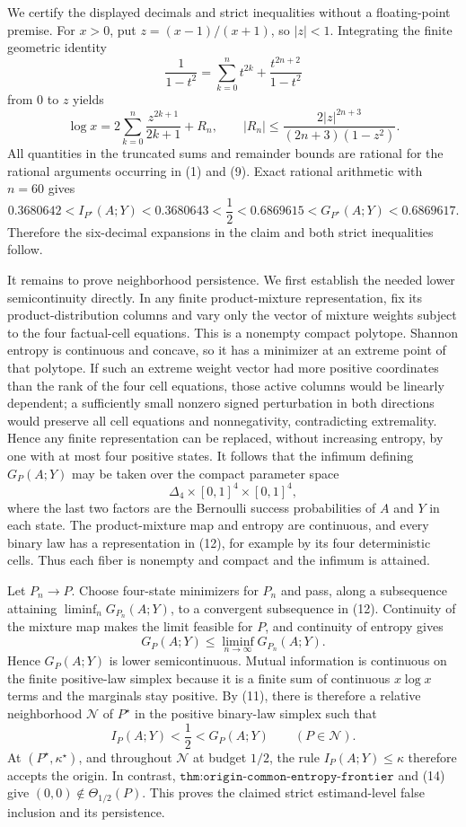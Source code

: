 We certify the displayed decimals and strict inequalities without a floating-point premise. For \(x>0\), put \(z=(x-1)/(x+1)\), so \(|z|<1\). Integrating the finite geometric identity
\[
\frac1{1-t^2}=\sum_{k=0}^{n}t^{2k}+\frac{t^{2n+2}}{1-t^2}
\]
from \(0\) to \(z\) yields
\[
\log x=2\sum_{k=0}^{n}\frac{z^{2k+1}}{2k+1}+R_n,
\qquad
|R_n|\leq
\frac{2|z|^{2n+3}}{(2n+3)(1-z^2)}.
\tag{10}
\]
All quantities in the truncated sums and remainder bounds are rational for the rational arguments occurring in (1) and (9). Exact rational arithmetic with \(n=60\) gives
\[
0.3680642<I_{P^\star}(A;Y)<0.3680643<\frac12
<0.6869615<G_{P^\star}(A;Y)<0.6869617.
\tag{11}
\]
Therefore the six-decimal expansions in the claim and both strict inequalities follow.

It remains to prove neighborhood persistence. We first establish the needed lower semicontinuity directly. In any finite product-mixture representation, fix its product-distribution columns and vary only the vector of mixture weights subject to the four factual-cell equations. This is a nonempty compact polytope. Shannon entropy is continuous and concave, so it has a minimizer at an extreme point of that polytope. If such an extreme weight vector had more positive coordinates than the rank of the four cell equations, those active columns would be linearly dependent; a sufficiently small nonzero signed perturbation in both directions would preserve all cell equations and nonnegativity, contradicting extremality. Hence any finite representation can be replaced, without increasing entropy, by one with at most four positive states. It follows that the infimum defining \(G_P(A;Y)\) may be taken over the compact parameter space
\[
\Delta_4\times[0,1]^4\times[0,1]^4,
\tag{12}
\]
where the last two factors are the Bernoulli success probabilities of \(A\) and \(Y\) in each state. The product-mixture map and entropy are continuous, and every binary law has a representation in (12), for example by its four deterministic cells. Thus each fiber is nonempty and compact and the infimum is attained.

Let \(P_n\to P\). Choose four-state minimizers for \(P_n\) and pass, along a subsequence attaining \(\liminf_nG_{P_n}(A;Y)\), to a convergent subsequence in (12). Continuity of the mixture map makes the limit feasible for \(P\), and continuity of entropy gives
\[
G_P(A;Y)\leq\liminf_{n\to\infty}G_{P_n}(A;Y).
\tag{13}
\]
Hence \(G_P(A;Y)\) is lower semicontinuous. Mutual information is continuous on the finite positive-law simplex because it is a finite sum of continuous \(x\log x\) terms and the marginals stay positive. By (11), there is therefore a relative neighborhood \(\mathcal N\) of \(P^\star\) in the positive binary-law simplex such that
\[
I_P(A;Y)<\frac12<G_P(A;Y)
\qquad(P\in\mathcal N).
\tag{14}
\]
At \((P^\star,\kappa^\star)\), and throughout \(\mathcal N\) at budget \(1/2\), the rule \(I_P(A;Y)\leq\kappa\) therefore accepts the origin. In contrast, \(\texttt{thm:origin-common-entropy-frontier}\) and (14) give \((0,0)\notin\Theta_{1/2}(P)\). This proves the claimed strict estimand-level false inclusion and its persistence.